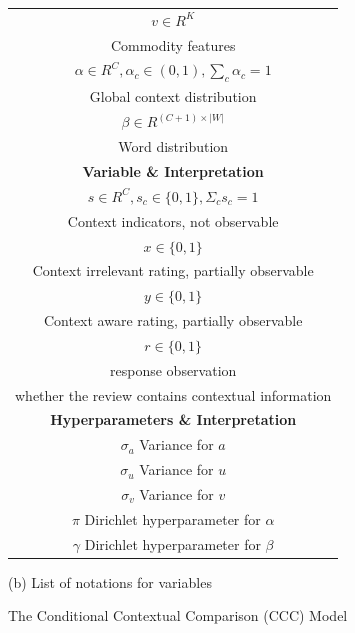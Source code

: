 \documentclass{llncs}
\begin{document}
\begin{figure}
\begin{minipage}[b]{.3\linewidth}
{\begin{tabular}{|c|}
$v \in R^K$ \\ Commodity features \\\hline
$\alpha \in R^C, \alpha_c\in (0,1), \sum_c \alpha_c=1 $ \\ Global context distribution \\\hline
$\beta \in R^{(C+1)\times |W|}$ \\ Word distribution \\\hline
\hline
\bf{Variable \& Interpretation }\\\hline\hline
$s \in R^C, s_c\in \{0,1\}, \Sigma_c s_c =1$ \\ Context indicators, not observable \\\hline
$x \in \{0,1\}$ \\ Context irrelevant rating, partially observable \\\hline
$y \in \{0,1\}$ \\ Context aware rating, partially observable \\\hline
$r \in \{0,1\}$ \\  response observation\\whether the review contains contextual information\\\hline
\hline \bf{ Hyperparameters \& Interpretation} \\\hline\hline
$\sigma_a $ Variance for $a$ \\\hline
$\sigma_u $ Variance for $u$ \\\hline
$\sigma_v $  Variance for $v$ \\\hline
$\pi $  Dirichlet hyperparameter for $\alpha$ \\\hline
$\gamma$  Dirichlet hyperparameter for $\beta$ \\\hline
\hline
\end{tabular}}
\vfill
\centerline{(b) List of notations for variables}
\end{minipage}
\caption{The Conditional Contextual Comparison (CCC) Model}\label{fig:model}
\end{figure}
\end{document}

